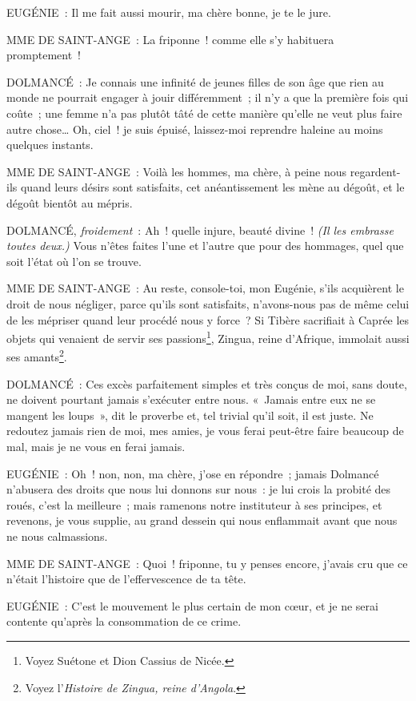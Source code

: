 \documentclass[french,twoside]{book} %
\begin{document}
EUGÉNIE : Il me fait aussi mourir, ma chère bonne, je te le jure.\par
MME DE SAINT-ANGE : La friponne ! comme elle s’y habituera promptement !\par
DOLMANCÉ : Je connais une infinité de jeunes filles de son âge que rien au monde ne pourrait engager à jouir différemment ; il n’y a que la première fois qui coûte ; une femme n’a pas plutôt tâté de cette manière qu’elle ne veut plus faire autre chose… Oh, ciel ! je suis épuisé, laissez-moi reprendre haleine au moins quelques instants.\par
MME DE SAINT-ANGE : Voilà les hommes, ma chère, à peine nous regardent-ils quand leurs désirs sont satisfaits, cet anéantissement les mène au dégoût, et le dégoût bientôt au mépris.\par
DOLMANCÉ, {\itshape froidement} : Ah ! quelle injure, beauté divine ! {\itshape (Il les embrasse toutes deux.)} Vous n’êtes faites l’une et l’autre que pour des hommages, quel que soit l’état où l’on se trouve.\par
MME DE SAINT-ANGE : Au reste, console-toi, mon Eugénie, s’ils acquièrent le droit de nous négliger, parce qu’ils sont satisfaits, n’avons-nous pas de même celui de les mépriser quand leur procédé nous y force ? Si Tibère sacrifiait à Caprée les objets qui venaient de servir ses passions\footnote{ Voyez Suétone et Dion Cassius de Nicée.}, Zingua, reine d’Afrique, immolait aussi ses amants\footnote{ Voyez l’{\itshape Histoire de Zingua, reine d’Angola}.}.\par
DOLMANCÉ : Ces excès parfaitement simples et très conçus de moi, sans doute, ne doivent pourtant jamais s’exécuter entre nous. « Jamais entre eux ne se mangent les loups », dit le proverbe et, tel trivial qu’il soit, il est juste. Ne redoutez jamais rien de moi, mes amies, je vous ferai peut-être faire beaucoup de mal, mais je ne vous en ferai jamais.\par
EUGÉNIE : Oh ! non, non, ma chère, j’ose en répondre ; jamais Dolmancé n’abusera des droits que nous lui donnons sur nous : je lui crois la probité des roués, c’est la meilleure ; mais ramenons notre instituteur à ses principes, et revenons, je vous supplie, au grand dessein qui nous enflammait avant que nous ne nous calmassions.\par
MME DE SAINT-ANGE : Quoi ! friponne, tu y penses encore, j’avais cru que ce n’était l’histoire que de l’effervescence de ta tête.\par
EUGÉNIE : C’est le mouvement le plus certain de mon cœur, et je ne serai contente qu’après la consommation de ce crime.\par
\end{document}
